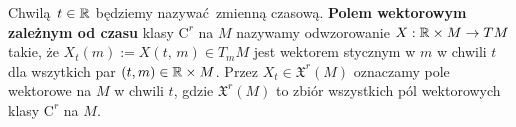 \begin{figure}[!h]
\centering
{}
\end{figure}

Chwilą \(t\in\mathbb{R}\) będziemy nazywać zmienną czasową. \textbf{Polem wektorowym zależnym od czasu} klasy \(\mathrm{C}^r\) na \(M\) nazywamy odwzorowanie \(X:\mathbb{R}\times M\rightarrow TM\) takie, że \(X_t(m):=X(t,\,m) \in T_{m} M\) jest wektorem stycznym w \(m\) w chwili \(t\) dla wszytkich par \((t, m) \in \mathbb{R} \times M\). Przez \(X_t\in \mathfrak{X}^r(M)\) oznaczamy pole wektorowe na \(M\) w chwili \(t\), gdzie \(\mathfrak{X}^r(M)\) to zbiór wszystkich pól wektorowych klasy \(\mathrm{C}^r\) na \(M\). 

